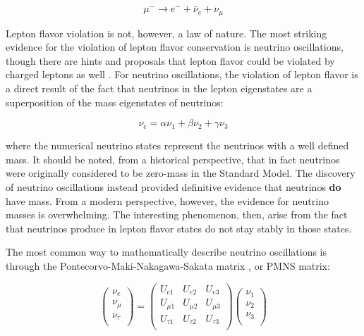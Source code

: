 \begin{equation}
\mu^- \rightarrow e^- + \bar{\nu}_e + \nu_\mu
\end{equation}

Lepton flavor violation is not, however, a law of nature.  The most striking evidence for the violation of lepton flavor conservation is neutrino oscillations, though there are hints and proposals that lepton flavor could be violated by charged leptons as well \cite{Bartoszek:2014mya}.  For neutrino oscillations, the violation of lepton flavor is a direct result of the fact that neutrinos in the lepton eigenstates are a superposition of the mass eigenstates of neutrinos:

\begin{equation}
\nu_e = \alpha \nu_1 + \beta \nu_2 + \gamma \nu_3
\end{equation}

where the numerical neutrino states represent the neutrinos with a well defined mass.  It should be noted, from a historical perspective, that in fact neutrinos were originally considered to be zero-mass in the Standard Model.  The discovery of neutrino oscillations instead provided definitive evidence that neutrinos {\bf do} have mass.  From a modern perspective, however, the evidence for neutrino masses is overwhelming.  The interesting phenomenon, then, arise from the fact that neutrinos produce in lepton flavor states do not stay stably in those states.  

The most common way to mathematically describe neutrino oscillations is through the Pontecorvo-Maki-Nakagawa-Sakata matrix \cite{Maki:1962mu, Bilenky:1978nj}, or PMNS matrix:

\begin{equation}
  \left(
  \begin{array}{c}
    \nu_e \\
    \nu_\mu \\
    \nu_\tau \\
  \end{array}
  \right)
  =
  \left(
  \begin{array}{ccc}
    U_{e1} & U_{e2} & U_{e3}  \\
    U_{\mu1} & U_{\mu2} & U_{\mu3}  \\
    U_{\tau1} & U_{\tau2} & U_{\tau3}  \\
  \end{array} 
  \right)
  \left(
  \begin{array}{c}
    \nu_1 \\
    \nu_2 \\
    \nu_3 \\
  \end{array}
  \right)
\end{equation}


